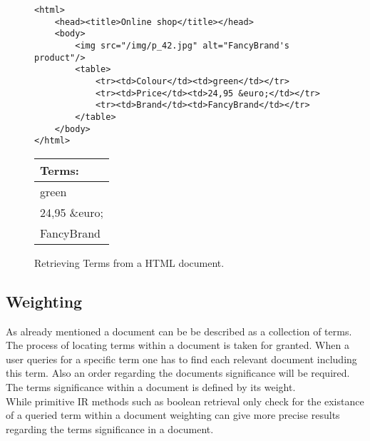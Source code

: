 \begin{figure}[h]
    \center
    \begin{lstlisting}
<html>
    <head><title>Online shop</title></head>
    <body>
        <img src="/img/p_42.jpg" alt="FancyBrand's product"/>
        <table>
            <tr><td>Colour</td><td>green</td></tr>
            <tr><td>Price</td><td>24,95 &euro;</td></tr>
            <tr><td>Brand</td><td>FancyBrand</td></tr>
        </table>
    </body>
</html>
    \end{lstlisting}
    \begin{tabular}{ l }
        \rowcolor{\dustRowHead}
        \textbf{Terms:}\\\hline
        green\\
        24,95 \&euro;\\
        FancyBrand%
    \end{tabular}
    \caption{Retrieving Terms from a HTML document.}
    \label{fig:TermRetrieving}
\end{figure}


\subsection{Weighting}
\label{sec:weighting}
As already mentioned a document can be be described as a collection of terms.
The process of locating terms within a document is taken for granted.
When a user queries for a specific term one has to find each relevant document including this term.
Also an order regarding the documents significance will be required.
The terms significance within a document is defined by its weight.\citep[p.~117]{manning:2009}\\
While primitive IR methods such as boolean retrieval only check for the existance of a queried term within a document weighting can give more precise results regarding the terms significance in a document.\citep[p.~109]{manning:2009}

